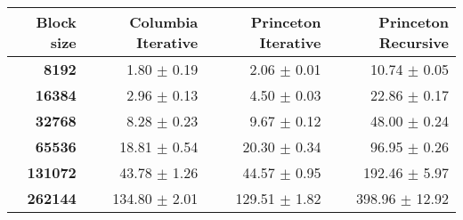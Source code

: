 \begin{tabular}{rrrr}\toprule
\textbf{Block size}  & \textbf{Columbia Iterative} & \textbf{Princeton Iterative} & \textbf{Princeton Recursive}\\\midrule
\textbf{8192}  & 1.80 $\pm$ 0.19 & 2.06 $\pm$ 0.01 & 10.74 $\pm$ 0.05\\
\textbf{16384}  & 2.96 $\pm$ 0.13 & 4.50 $\pm$ 0.03 & 22.86 $\pm$ 0.17\\
\textbf{32768}  & 8.28 $\pm$ 0.23 & 9.67 $\pm$ 0.12 & 48.00 $\pm$ 0.24\\
\textbf{65536}  & 18.81 $\pm$ 0.54 & 20.30 $\pm$ 0.34 & 96.95 $\pm$ 0.26\\
\textbf{131072}  & 43.78 $\pm$ 1.26 & 44.57 $\pm$ 0.95 & 192.46 $\pm$ 5.97\\
\textbf{262144} & 134.80 $\pm$ 2.01 & 129.51 $\pm$ 1.82 & 398.96 $\pm$ 12.92\\
\bottomrule
\end{tabular}
